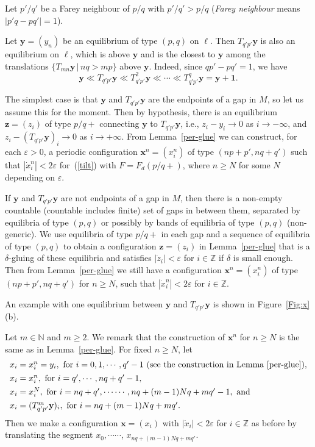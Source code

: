 \documentclass[12pt]{article}
\newcommand{\Z}{\mathbb{Z}}
\newcommand{\N}{\mathbb{N}}
\newcommand{\eps}{\varepsilon}
\newcommand{\refer}[1]{~(\ref{#1})}
\newcommand{\zbf}{{\mathbf{z}}}
\newcommand{\xbf}{{\mathbf{x}}}
\newcommand{\ybf}{{\mathbf{y}}}
\newcommand{\one}{{\mathbf{1}}}
\begin{document}
Let $p'/q'$ be a Farey neighbour of $p/q$ with $p'/q' > p/q$ ({\em Farey neighbour} means $|p'q-pq'|=1$).

Let $\ybf=(y_n)$ be an equilibrium of type $(p,q)$ on $\ell$. Then $T_{q'p'}\ybf$ is also an equilibrium on $\ell$, which is above $\ybf$ and is the closest to $\ybf$ among the translations $\{T_{mn}\ybf\,|\,nq>mp\}$ above $\ybf$. Indeed, since $qp'-pq'=1$, we have
$$
\ybf\ll T_{q'p'}\ybf\ll T^2_{q'p'}\ybf\ll\cdots\ll T^q_{q'p'}\ybf=\ybf+\one.
$$

The simplest case is that
$\ybf$ and $T_{q'p'}\ybf$ are the endpoints of a gap in $M$, so let us assume this for the moment.
Then by hypothesis, there is an equilibrium $\zbf=(z_i)$ of type $p/q+$ connecting $\ybf$ to $T_{q'p'}\ybf$, i.e., $z_i-y_i\to 0$ as $i\to -\infty$, and $z_i-(T_{q'p'}\ybf)_i\to 0$ as $i\to +\infty$.
From Lemma~\ref{per-glue} we can construct, for each $\eps>0$,  a periodic configuration
$\xbf^n=(x_i^n)$ of type $(np+p',nq+q')$ such that $|\dot{x}_i^n|<2\eps$ for\refer{tilt} with
$F=F_d(p/q+)$, where $n\geq N$ for some $N$  depending on $\eps$.

If $\ybf$ and $T_{q'p'}\ybf$ are not endpoints of a gap in $M$, %
 then there is a non-empty countable (countable includes finite) set of gaps in between them, separated by equilibria of type $(p,q)$ or possibly by bands of equilibria of type $(p,q)$ (non-generic). We use equilibria of type $p/q+$ in each gap and a sequence of equilibria of type $(p,q)$ to obtain a configuration $\zbf=(z_i)$ in Lemma~\ref{per-glue} that is a $\delta$-gluing of these equilibria and satisfies $|\dot{z}_i|<\eps$ for $i\in\Z$ if $\delta$ is small enough. Then from Lemma~\ref{per-glue} we still have a configuration $\xbf^n=(x_i^n)$ of type $(np+p',nq+q')$ for $n\geq N$, such that $|\dot{x}_i^n|<2\eps$ for $i\in\Z$.

An example with one equilibrium between $\ybf$ and $T_{q'p'}\ybf$ is shown in
Figure~\ref{Fig:x}(b).

Let $m\in\N$ and $m\geq 2$. We remark that the construction of $\xbf^n$ for $n\geq N$ is the same as in Lemma~\ref{per-glue}. For fixed $n\geq N$, let
$$
\begin{array}{l}
x_i=x^n_i=y_i, \mbox{ for } i=0,1,\cdots,q'-1\ (\mbox{see the construction in Lemma~\ref{per-glue}}),\\[4pt]
x_i=x^n_i, \mbox{ for } i=q',\cdots,nq+q'-1,\\[4pt]
 x_i=x^N_i, \mbox{ for }i=nq+q',\cdots\cdots, nq+(m-1)Nq+mq'-1,\mbox{ and }\\[4pt]
x_i=(T_{q'p'}^m\ybf)_i, \mbox{ for }i=nq+(m-1)Nq+mq'.
\end{array}
$$
Then we make a configuration $\xbf=(x_i)$ with $|\dot{x}_i|< 2\eps$ for $i\in\Z$ as before by translating the segment $x_0,\cdots\cdots$,
$x_{nq+(m-1)Nq+mq'}$.
\end{document}

